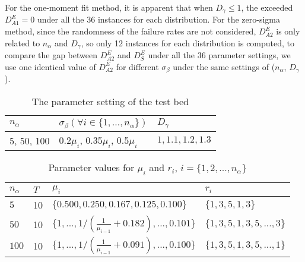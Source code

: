 \documentclass[preprint,12pt]{elsarticle}
\begin{document}
For the one-moment fit method, it is apparent that when $D_{\gamma} \leq 1$, the exceeded $D^{E}_{A1} = 0$ under all the 36 instances for each distribution. For the zero-sigma method, since the randomness of the failure rates are not considered, $D^{E}_{A2}$ is only related to $n_{\alpha}$ and $D_{\gamma}$, so only 12 instances for each distribution is computed, to compare the gap between $D^{E}_{A2}$ and $D^{E}_{S}$ under all the 36 parameter settings, we use one identical value of $D^{E}_{A2}$ for different $\sigma_{\beta}$ under the same settings of ($n_{\alpha}$, $D_{\gamma}$).





\begin{table}[htbp]
  \centering
  \caption{The parameter setting of the test bed}
    \begin{tabular}{lll}
    \toprule
  $n_{\alpha}$ & $\sigma_{\beta} (\forall i \in \{1,...,n_{\alpha}\})$ & $D_{\gamma}$\\
    \midrule
    5, 50, 100 & 0.2$\mu_{i}$, 0.35$\mu_{i}$, 0.5$\mu_{i}$ & $ 1, 1.1, 1.2, 1.3$ \\
  \bottomrule
    \end{tabular}%
  \label{tab:testbedps}%
\end{table}

\begin{table}[htbp]
  \centering
  \caption{Parameter values for $\mu_{i}$ and $r_{i}$, $i=\{1,2,...,n_{\alpha}\}$}
    \begin{tabular}{llll}
    \toprule
    $n_{\alpha}$ & $T$ & $\mu_{i}$ &  $r_{i}$\\
    \midrule
    $5$   &10& $\{0.500, 0.250, 0.167, 0.125, 0.100\}$ &$\{1,3,5,1,3\}$\\
    $50$  &10& $\{1,...,1/(\frac{1}{\mu_{i-1}}+0.182),...,0.101\}$ &$\{1,3,5,1,3,5,...,3\}$\\
    $100$ &10& $\{1,...,1/(\frac{1}{\mu_{i-1}}+0.091),...,0.100\}$ &$\{1,3,5,1,3,5,...,1\}$\\
    \bottomrule
    \end{tabular}%
  \label{tab:testbedmur}%
\end{table}
\end{document}
